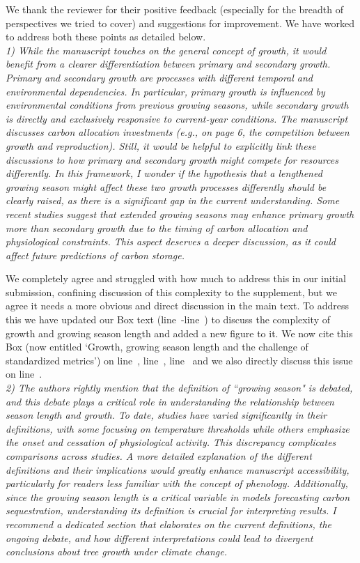 \documentclass[11pt]{article}
\newcommand{\lr}[1]{line~\lineref{#1}}
\begin{document}
We thank the reviewer for their positive feedback (especially for the breadth of perspectives we tried to cover) and suggestions for improvement. We have worked to address both these points as detailed below.\\

\emph{1) While the manuscript touches on the general concept of growth, it would benefit from a clearer differentiation between primary and secondary growth. Primary and secondary growth are processes with different temporal and environmental dependencies. In particular, primary growth is influenced by environmental conditions from previous growing seasons, while secondary growth is directly and exclusively responsive to current-year conditions. The manuscript discusses carbon allocation investments (e.g., on page 6, the competition between growth and reproduction). Still, it would be helpful to explicitly link these discussions to how primary and secondary growth might compete for resources differently. In this framework, I wonder if the hypothesis that a lengthened growing season might affect these two growth processes differently should be clearly raised, as there is a significant gap in the current understanding. Some recent studies suggest that extended growing seasons may enhance primary growth more than secondary growth due to the timing of carbon allocation and physiological constraints. This aspect deserves a deeper discussion, as it could affect future predictions of carbon storage.}

We completely agree and struggled with how much to address this in our initial submission, confining discussion of this complexity to the supplement, but we agree it needs a more obvious and direct discussion in the main text. To address this we have updated our Box text (\lr{startbox}-\lr{endbox}) to discuss the complexity of growth and growing season length and added a new figure to it. We now cite this Box (now entitled `Growth, growing season length and the challenge of standardized metrics') on \lr{R1box0}, \lr{R1box1}, \lr{R1box2} and we also directly discuss this issue on \lr{R1growth}. \\


\emph{2) The authors rightly mention that the definition of ``growing season" is debated, and this debate plays a critical role in understanding the relationship between season length and growth. To date, studies have varied significantly in their definitions, with some focusing on temperature thresholds while others emphasize the onset and cessation of physiological activity. This discrepancy complicates comparisons across studies. A more detailed explanation of the different definitions and their implications would greatly enhance manuscript accessibility, particularly for readers less familiar with the concept of phenology. Additionally, since the growing season length is a critical variable in models forecasting carbon sequestration, understanding its definition is crucial for interpreting results. I recommend a dedicated section that elaborates on the current definitions, the ongoing debate, and how different interpretations could lead to divergent conclusions about tree growth under climate change.}
\end{document}
